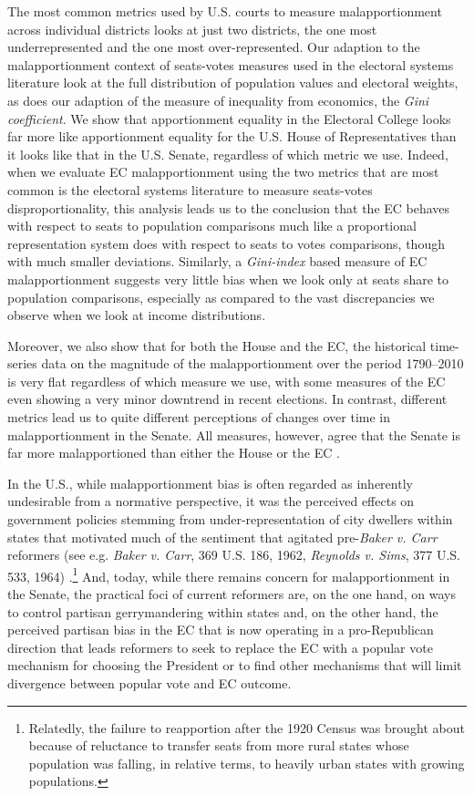 The most common metrics used by U.S. courts to measure malapportionment across individual districts looks at just two districts, the one most underrepresented and the one most over-represented. Our adaption to the malapportionment context of seats-votes measures used in the electoral systems literature look at the full distribution of population values and electoral weights, as does our adaption of the measure of inequality from economics, the \textit{Gini coefficient}. We show that apportionment equality in the Electoral College looks far more like apportionment equality for the U.S. House of Representatives than it looks like that in the U.S. Senate, regardless of which metric we use. Indeed, when we evaluate EC malapportionment using the two metrics that are most common is the electoral systems literature to measure seats-votes disproportionality, this analysis leads us to the conclusion that the EC behaves with respect to seats to population comparisons much like a proportional representation system does with respect to seats to votes comparisons, though with much smaller deviations. Similarly, a \textit{Gini-index} based measure of EC malapportionment suggests very little bias when we look only at seats share to population comparisons, especially as compared to the vast discrepancies we observe when we look at income distributions. 

Moreover, we also show that for both the House and the EC, the historical time-series data on the magnitude of the malapportionment over the period 1790--2010 is very flat regardless of which measure we use, with some measures of the EC even showing a very minor downtrend in recent elections. In contrast, different metrics lead us to quite different perceptions of changes over time in malapportionment in the Senate. All measures, however, agree that the Senate is far more malapportioned than either the House or the EC \citep{LadewigJasinski2008}.

In the U.S., while malapportionment bias is often regarded as inherently undesirable from a normative perspective, it was the perceived effects on government policies stemming from under-representation of city dwellers within states that motivated much of the sentiment that agitated pre-\textit{Baker v. Carr} reformers (see e.g. \textit{Baker v. Carr}, 369 U.S. 186, 1962, \textit{Reynolds v. Sims}, 377 U.S. 533, 1964) \citep{Baker1955, McCubbinsSchwartz1988}.\footnote{Relatedly, the failure to reapportion after the 1920 Census was brought about because of reluctance to transfer seats from more rural states whose population was falling, in relative terms, to heavily urban states with growing populations.} And, today, while there remains concern for malapportionment in the Senate, the practical foci of current reformers are, on the one hand, on ways to control partisan gerrymandering within states and, on the other hand, the perceived partisan bias in the EC that is now operating in a pro-Republican direction that leads reformers to seek to replace the EC with a popular vote mechanism for choosing the President or to find other mechanisms that will limit divergence between popular vote and EC outcome.

